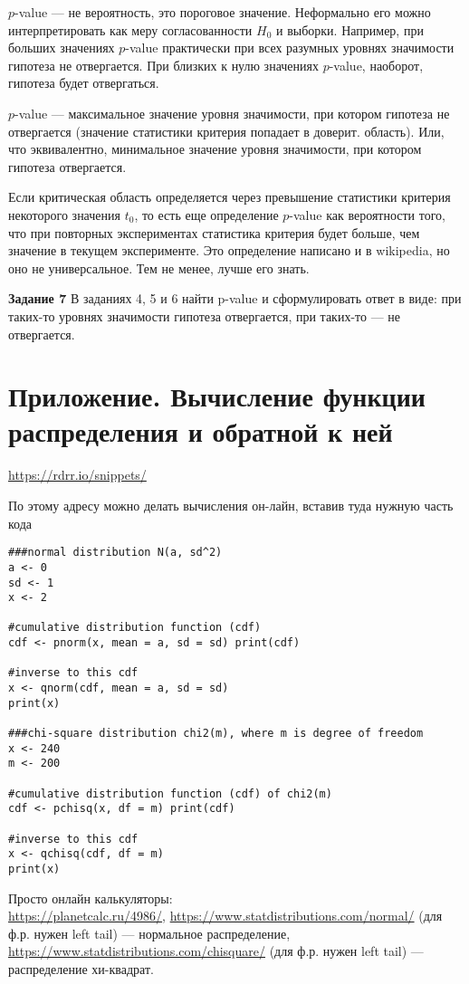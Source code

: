 $p$-value --- не вероятность, это пороговое значение. Неформально его можно интерпретировать как меру согласованности $H_{0}$ и выборки. Например, при больших значениях $p$-value практически при всех разумных уровнях значимости гипотеза не отвергается. При близких к нулю значениях $p$-value, наоборот, гипотеза будет отвергаться.

$p$-value --- максимальное значение уровня значимости, при котором гипотеза не отвергается (значение статистики критерия попадает в доверит. область). Или, что эквивалентно, минимальное значение уровня значимости, при котором гипотеза отвергается.

Если критическая область определяется через превышение статистики критерия некоторого значения $t_0$, то есть еще определение $p$-value как вероятности того, что при повторных экспериментах статистика критерия будет больше, чем значение в текущем эксперименте. Это определение написано и в wikipedia, но оно не универсальное. Тем не менее, лучше его знать.

\textbf{Задание 7} В заданиях 4, 5 и 6 найти p-value и сформулировать ответ в виде: при таких-то уровнях значимости гипотеза отвергается, при таких-то --- не отвергается.

\newpage
\section{Приложение. Вычисление функции распределения и обратной к ней}

\url{https://rdrr.io/snippets/}

По этому адресу можно делать вычисления он-лайн, вставив туда нужную часть кода

\begin{verbatim}
###normal distribution N(a, sd^2)
a <- 0
sd <- 1
x <- 2

#cumulative distribution function (cdf)
cdf <- pnorm(x, mean = a, sd = sd) print(cdf)

#inverse to this cdf
x <- qnorm(cdf, mean = a, sd = sd)
print(x)

###chi-square distribution chi2(m), where m is degree of freedom
x <- 240
m <- 200

#cumulative distribution function (cdf) of chi2(m)
cdf <- pchisq(x, df = m) print(cdf)

#inverse to this cdf
x <- qchisq(cdf, df = m)
print(x)
\end{verbatim}

Просто онлайн калькуляторы:\\
\url{https://planetcalc.ru/4986/}, \url{https://www.statdistributions.com/normal/} (для ф.р. нужен left tail) --- нормальное распределение,\\
\url{https://www.statdistributions.com/chisquare/} (для ф.р. нужен left tail) --- распределение хи-квадрат.

